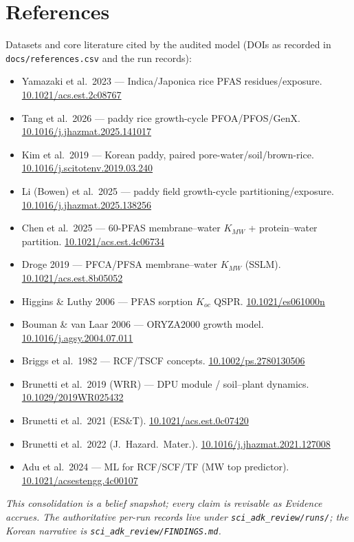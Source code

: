 \documentclass[11pt]{article}
\begin{document}
\section{References}
\label{sec:refs}

Datasets and core literature cited by the audited model
(DOIs as recorded in \texttt{docs/references.csv} and the run records):

\begin{itemize}
  \item Yamazaki et al.\ 2023 --- Indica/Japonica rice PFAS residues/exposure. \href{https://doi.org/10.1021/acs.est.2c08767}{10.1021/acs.est.2c08767}
  \item Tang et al.\ 2026 --- paddy rice growth-cycle PFOA/PFOS/GenX. \href{https://doi.org/10.1016/j.jhazmat.2025.141017}{10.1016/j.jhazmat.2025.141017}
  \item Kim et al.\ 2019 --- Korean paddy, paired pore-water/soil/brown-rice. \href{https://doi.org/10.1016/j.scitotenv.2019.03.240}{10.1016/j.scitotenv.2019.03.240}
  \item Li (Bowen) et al.\ 2025 --- paddy field growth-cycle partitioning/exposure. \href{https://doi.org/10.1016/j.jhazmat.2025.138256}{10.1016/j.jhazmat.2025.138256}
  \item Chen et al.\ 2025 --- 60-PFAS membrane--water $K_{MW}$ + protein--water partition. \href{https://doi.org/10.1021/acs.est.4c06734}{10.1021/acs.est.4c06734}
  \item Droge 2019 --- PFCA/PFSA membrane--water $K_{MW}$ (SSLM). \href{https://doi.org/10.1021/acs.est.8b05052}{10.1021/acs.est.8b05052}
  \item Higgins \& Luthy 2006 --- PFAS sorption $K_{oc}$ QSPR. \href{https://doi.org/10.1021/es061000n}{10.1021/es061000n}
  \item Bouman \& van Laar 2006 --- ORYZA2000 growth model. \href{https://doi.org/10.1016/j.agsy.2004.07.011}{10.1016/j.agsy.2004.07.011}
  \item Briggs et al.\ 1982 --- RCF/TSCF concepts. \href{https://doi.org/10.1002/ps.2780130506}{10.1002/ps.2780130506}
  \item Brunetti et al.\ 2019 (WRR) --- DPU module / soil--plant dynamics. \href{https://doi.org/10.1029/2019WR025432}{10.1029/2019WR025432}
  \item Brunetti et al.\ 2021 (ES\&T). \href{https://doi.org/10.1021/acs.est.0c07420}{10.1021/acs.est.0c07420}
  \item Brunetti et al.\ 2022 (J.\ Hazard.\ Mater.). \href{https://doi.org/10.1016/j.jhazmat.2021.127008}{10.1016/j.jhazmat.2021.127008}
  \item Adu et al.\ 2024 --- ML for RCF/SCF/TF (MW top predictor). \href{https://doi.org/10.1021/acsestengg.4c00107}{10.1021/acsestengg.4c00107}
\end{itemize}

\vspace{1em}
\noindent\textit{This consolidation is a belief snapshot; every claim
is revisable as Evidence accrues. The authoritative per-run records
live under \texttt{sci\_adk\_review/runs/}; the Korean narrative is
\texttt{sci\_adk\_review/FINDINGS.md}.}
\end{document}
